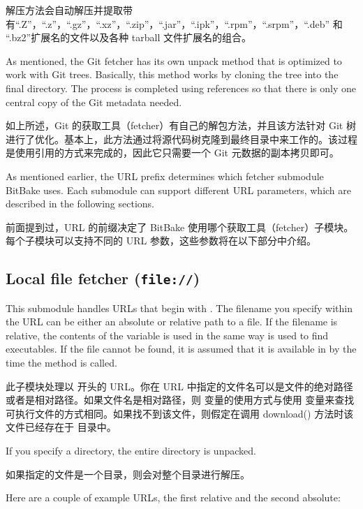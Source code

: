 解压方法会自动解压并提取带有``.Z''，``.z''，``.gz''，``.xz''，``.zip''，``.jar''，``.ipk''，``.rpm''，``.srpm''，``.deb'' 和 ``.bz2''扩展名的文件以及各种 tarball 文件扩展名的组合。

As mentioned, the Git fetcher has its own unpack method that is optimized to work with Git trees. Basically, this method works by cloning the tree into the final directory. The process is completed using references so that there is only one central copy of the Git metadata needed.

如上所述，Git 的获取工具（fetcher）有自己的解包方法，并且该方法针对 Git 树进行了优化。基本上，此方法通过将源代码树克隆到最终目录中来工作的。该过程是使用引用的方式来完成的，因此它只需要一个 Git 元数据的副本拷贝即可。


As mentioned earlier, the URL prefix determines which fetcher submodule BitBake uses. Each submodule can support different URL parameters, which are described in the following sections.

前面提到过，URL 的前缀决定了 BitBake 使用哪个获取工具（fetcher）子模块。每个子模块可以支持不同的 URL 参数，这些参数将在以下部分中介绍。

\subsection{Local file fetcher (\texttt{file://})}

This submodule handles URLs that begin with . The filename you specify within the URL can be either an absolute or relative path to a file. If the filename is relative, the contents of the  variable is used in the same way  is used to find executables. If the file cannot be found, it is assumed that it is available in  by the time the  method is called.

此子模块处理以  开头的 URL。你在 URL 中指定的文件名可以是文件的绝对路径或者是相对路径。如果文件名是相对路径，则  变量的使用方式与使用  变量来查找可执行文件的方式相同。如果找不到该文件，则假定在调用 download() 方法时该文件已经存在于  目录中。

If you specify a directory, the entire directory is unpacked.

如果指定的文件是一个目录，则会对整个目录进行解压。

Here are a couple of example URLs, the first relative and the second absolute:

